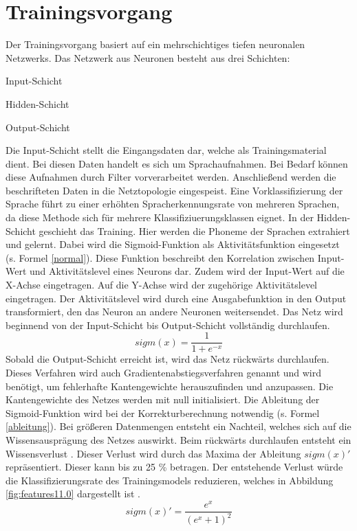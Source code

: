 \section{Trainingsvorgang}

Der Trainingsvorgang basiert auf ein mehrschichtiges tiefen neuronalen Netzwerks. Das Netzwerk aus Neuronen besteht aus drei Schichten:
\begin{description}
	\item Input-Schicht
	\item Hidden-Schicht 
	\item Output-Schicht
\end{description}
Die Input-Schicht stellt die Eingangsdaten dar, welche als Trainingsmaterial dient. Bei diesen Daten handelt es sich um Sprachaufnahmen. Bei Bedarf können diese Aufnahmen durch Filter vorverarbeitet werden. Anschließend werden die beschrifteten Daten in die Netztopologie eingespeist. Eine Vorklassifizierung der Sprache führt zu einer erhöhten Spracherkennungsrate von mehreren Sprachen, da diese Methode sich für mehrere Klassifiziuerungsklassen eignet. In der Hidden-Schicht geschieht das Training. Hier werden die Phoneme der Sprachen extrahiert und gelernt. Dabei wird die Sigmoid-Funktion als Aktivitätsfunktion eingesetzt (s. Formel \ref{normal}). Diese Funktion beschreibt den Korrelation zwischen Input-Wert und  Aktivitätslevel eines Neurons dar. Zudem wird der Input-Wert auf die X-Achse eingetragen. Auf die Y-Achse wird der zugehörige Aktivitätslevel eingetragen. Der Aktivitätslevel wird durch eine Ausgabefunktion in den Output transformiert, den das Neuron an andere Neuronen weitersendet\cite{Neuronal31:online}. Das Netz wird beginnend von der Input-Schicht bis Output-Schicht vollständig durchlaufen. 
\begin{equation}
sigm(x)=\frac{ 1 }{1+e^{-x}  }
\label{normal}
\end{equation}
Sobald die Output-Schicht erreicht ist, wird das Netz rückwärts durchlaufen. Dieses Verfahren wird auch Gradientenabstiegsverfahren genannt und wird benötigt, um fehlerhafte Kantengewichte herauszufinden und anzupassen. Die Kantengewichte des Netzes werden mit null initialisiert. Die Ableitung der Sigmoid-Funktion wird bei der Korrekturberechnung notwendig (s. Formel \ref{ableitung}). Bei größeren Datenmengen entsteht ein Nachteil, welches sich auf die Wissensausprägung des Netzes auswirkt. Beim rückwärts durchlaufen entsteht ein Wissensverlust \cite{bishop.2006}. Dieser Verlust wird durch das Maxima der Ableitung $sigm(x)'$ repräsentiert. Dieser kann bis zu 25 \% betragen. Der entstehende Verlust würde die Klassifizierungsrate des Trainingsmodels reduzieren, welches in Abbildung \ref{fig:features11.0} dargestellt ist \cite{Kulbear.2017}.
\begin{equation}
sigm(x)'= \frac{ e^{x} }{(e^{x} +1)^2  }
\label{ableitung}
\end{equation}

